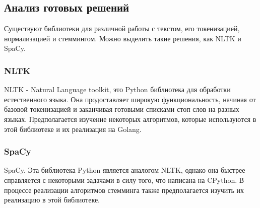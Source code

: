 \subsection{Анализ готовых решений}
Существуют библиотеки для различной работы с текстом, его токенизацией, нормализацией и стеммингом. Можно выделить такие решения, как NLTK и SpaCy. 

\subsubsection{NLTK}
NLTK - Natural Language toolkit, это Python библиотека для обработки естественного языка. Она продоставляет широкую 
функциональность, начиная от базовой токенизацией и заканчивая готовыми списками стоп слов на разных языках. 
Предполагается изучение некоторых алгоритмов, которые используются в этой библиотеке и их реализация на Golang. 

\subsubsection{SpaCy}
SpaCy. Эта библиотека Python является аналогом NLTK, однако она быстрее справляется с некоторыми задачами в силу того, что написана на CPython. В процессе реализации алгоритмов стемминга также предполагается изучить их реализацию в этой библиотеке. 

